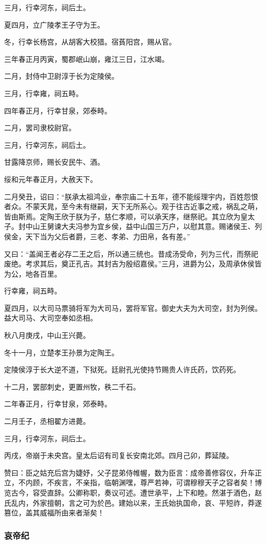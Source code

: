 \documentclass[]{article}
\begin{document}
三月，行幸河东，祠后土。

夏四月，立广陵孝王子守为王。

冬，行幸长杨宫，从胡客大校猎。宿萯阳宫，赐从官。

三年春正月丙寅，蜀郡岷山崩，雍江三日，江水竭。

二月，封侍中卫尉淳于长为定陵侯。

三月，行幸雍，祠五畤。

四年春正月，行幸甘泉，郊泰畤。

二月，罢司隶校尉官。

三月，行幸河东，祠后土。

甘露降京师，赐长安民牛、酒。

绥和元年春正月，大赦天下。

二月癸丑，诏曰：``朕承太祖鸿业，奉宗庙二十五年，德不能绥理宇内，百姓怨恨者众。不蒙天晁，至今未有继嗣，天下无所系心。观于往古近事之戒，祸乱之萌，皆由斯焉。定陶王欣于朕为子，慈仁孝顺，可以承天序，继祭祀。其立欣为皇太子。封中山王舅谏大夫冯参为宜乡侯，益中山国三万户，以慰其意。赐诸侯王、列侯金，天下当为父后者爵，三老、孝弟、力田帛，各有差。''

又曰：``盖闻王者必存二王之后，所以通三统也。昔成汤受命，列为三代，而祭祀废绝。考求其后，奠正孔吉。其封吉为殷绍嘉侯。''三月，进爵为公，及周承休侯皆为公，地各百里。

行幸雍，祠五畤。

夏四月，以大司马票骑将军为大司马，罢将军官。御史大夫为大司空，封为列侯。益大司马、大司空奉如丞相。

秋八月庚戌，中山王兴薨。

冬十一月，立楚孝王孙景为定陶王。

定陵侯淳于长大逆不道，下狱死。廷尉孔光使持节赐贵人许氏药，饮药死。

十二月，罢部刺史，更置州牧，秩二千石。

二年春正月，行幸甘泉，郊泰畤。

二月壬子，丞相翟方进薨。

三月，行幸河东，祠后土。

丙戌，帝崩于未央宫。皇太后诏有司复长安南北郊。四月己卯，葬延陵。

赞曰：臣之姑充后宫为婕妤，父子昆弟侍帷幄，数为臣言：成帝善修容仪，升车正立，不内顾，不疾言，不亲指，临朝渊嘿，尊严若神，可谓穆穆天子之容者矣！博览古今，容受直辞。公卿称职，奏议可述。遭世承平，上下和睦。然湛于酒色，赵氏乱内，外家擅朝，言之可为於邑。建始以来，王氏始执国命，哀、平短祚，莽遂篡位，盖其威福所由来者渐矣！

\hypertarget{header-n1106}{%
\subsubsection{哀帝纪}\label{header-n1106}}
\end{document}
